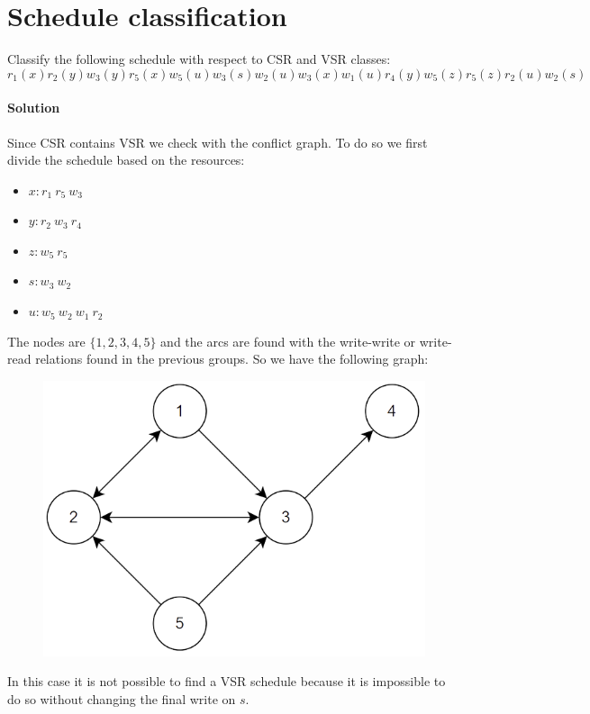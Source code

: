 \section{Schedule classification}

Classify the following schedule with respect to CSR and VSR classes:  
\[r_1(x) r_2(y) w_3(y) r_5(x) w_5(u) w_3(s)w_2(u) w_3(x) w_1(u) r_4(y) w_5(z) r_5(z) r_2(u) w_2(s)\]

\paragraph*{Solution}
Since CSR contains VSR we check with the conflict graph. To do so we first divide the schedule based on the resources: 
\begin{itemize}
    \item $x: r_1 \: r_5 \: w_3$
    \item $y: r_2 \: w_3 \: r_4$
    \item $z: w_5 \: r_5$
    \item $s: w_3 \: w_2$
    \item $u: w_5 \: w_2 \: w_1 \: r_2$
\end{itemize}
The nodes are $\{1,2,3,4,5\}$ and the arcs are found with the write-write or write-read relations found in the previous groups. So we have the following graph:
\begin{figure}[H]
    \centering
    \includegraphics[width=0.5\linewidth]{images/conflictgraph2.png}
\end{figure}
In this case it is not possible to find a VSR schedule because it is impossible to do so without changing the final write on $s$. 
